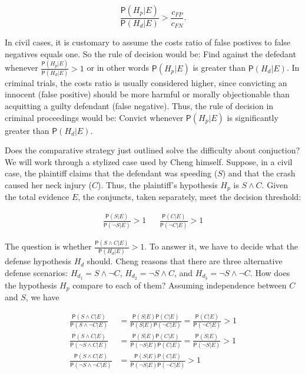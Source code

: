 \documentclass[10pt,dvipsnames,enabledeprecatedfontcommands]{scrartcl}
\newcommand{\n}{\neg}
\newcommand{\et}{\wedge}
\newcommand{\pr}[1]{\mathsf{P}(#1)}
\begin{document}
\[\frac{\pr{H_p \vert E}}{\pr{H_d \vert E}} > \frac{c_{FP}}{c_{FN}}.\]

\noindent
In civil cases, it is customary to assume the costs ratio of false
postives to false negatives equals one. So the rule of decision would
be: Find against the defedant whenever
\(\frac{\pr{H_p \vert E}}{\pr{H_d \vert E}} > 1\) or in other words
\(\pr{H_p \vert E}\) is greater than \(\pr{H_d \vert E}\). In criminal
trials, the costs ratio is usually considered higher, since convicting
an innocent (false positive) should be more harmful or morally
objectionable than acquitting a guilty defendant (false negative). Thus,
the rule of decision in criminal proceedings would be: Convict whenever
\(\pr{H_p \vert E}\) is significantly greater than \(\pr{H_d \vert E}\).

Does the comparative strategy just outlined solve the difficulty about
conjuction? We will work through a stylized case used by Cheng himself.
Suppose, in a civil case, the plaintiff claims that the defendant was
speeding (\(S\)) and that the crash caused her neck injury (\(C\)).
Thus, the plaintiff's hypothesis \(H_p\) is \(S\et C\). Given the total
evidence \(E\), the conjuncts, taken separately, meet the decision
threshold:

\begin{align}
 \nonumber 
 \frac{\pr{S\vert E}}{\pr{\neg S \vert E}} > 1   & & \frac{\pr{C\vert E}}{\pr{\neg C \vert E}} > 1
\end{align}

\noindent The question is whether
\(\frac{\pr{S\et C\vert E}}{\pr{H_d \vert E}}>1\). To answer it, we have
to decide what the defense hypothesis \(H_d\) should. Cheng reasons that
there are three alternative defense scenarios: \(H_{d_1}= S\et \n C\),
\(H_{d_2}=\n S \et C\), and \(H_{d_3}=\n S \et \n C\). How does the
hypothesis \(H_p\) compare to each of them? Assuming independence
between \(C\) and \(S\), we have

\begin{align}\label{eq:cheng-multiplication}
\frac{\pr{S\et C\vert E}}{\pr{S\et \n C\vert E}} & = \frac{\pr{S\vert E}\pr{C\vert E}}{\pr{S \vert E}\pr{\n C \vert E}}  =\frac{\pr{C\vert E}}{\pr{\n C \vert E}} > 1 \\
\nonumber
\frac{\pr{S\et C\vert E}}{\pr{\n S\et C\vert E}} & = \frac{\pr{S\vert E}\pr{C\vert E}}{\pr{\n S \vert E}\pr{C\vert E}}  = \frac{\pr{S\vert E}}{\pr{\n S \vert E}} > 1 \\
\nonumber
\frac{\pr{S\et C\vert E}}{\pr{\n S\et \n C\vert E}} & = \frac{\pr{S\vert E}\pr{C\vert E}}{\pr{\n S \vert E}\pr{\n C \vert E}}   > 1 
\end{align}
\end{document}
